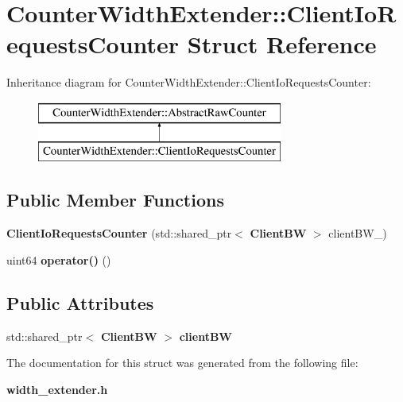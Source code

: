 \section{Counter\+Width\+Extender\+:\+:Client\+Io\+Requests\+Counter Struct Reference}
\label{structCounterWidthExtender_1_1ClientIoRequestsCounter}
Inheritance diagram for Counter\+Width\+Extender\+:\+:Client\+Io\+Requests\+Counter\+:\begin{figure}[H]
\begin{center}
\leavevmode
\includegraphics[height=2.000000cm]{structCounterWidthExtender_1_1ClientIoRequestsCounter}
\end{center}
\end{figure}
\subsection*{Public Member Functions}
\begin{DoxyCompactItemize}
\item 
{\bfseries Client\+Io\+Requests\+Counter} (std\+::shared\+\_\+ptr$<$ {\bf Client\+BW} $>$ client\+B\+W\+\_\+)\label{structCounterWidthExtender_1_1ClientIoRequestsCounter_ab3e30c3abdcbd4606e8bb86749abed85}

\item 
uint64 {\bfseries operator()} ()\label{structCounterWidthExtender_1_1ClientIoRequestsCounter_a13cfbc3fedce8d039b306c303f485ff8}

\end{DoxyCompactItemize}
\subsection*{Public Attributes}
\begin{DoxyCompactItemize}
\item 
std\+::shared\+\_\+ptr$<$ {\bf Client\+BW} $>$ {\bfseries client\+BW}\label{structCounterWidthExtender_1_1ClientIoRequestsCounter_a00d1a9c0c690843010b82d59fe1ab0b2}

\end{DoxyCompactItemize}


The documentation for this struct was generated from the following file\+:\begin{DoxyCompactItemize}
\item 
{\bf width\+\_\+extender.\+h}\end{DoxyCompactItemize}
